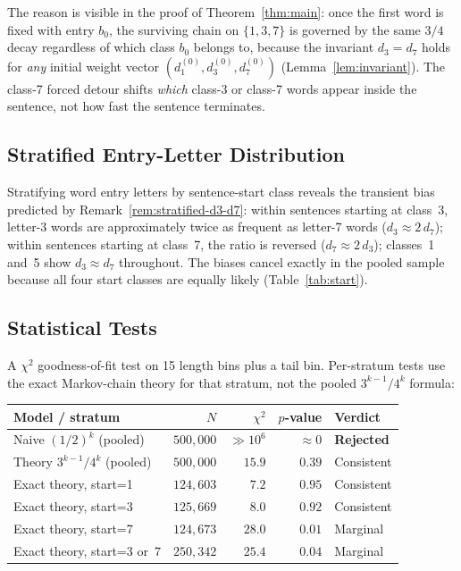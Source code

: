 \documentclass[12pt]{article}
\theoremstyle{definition}
\theoremstyle{remark}
\begin{document}
The reason is visible in the proof of Theorem~\ref{thm:main}: once the
first word is fixed with entry $b_0$, the surviving chain on $\{1,3,7\}$
is governed by the same $3/4$ decay regardless of which class $b_0$
belongs to, because the invariant $d_3 = d_7$ holds for \emph{any}
initial weight vector $(d_1^{(0)}, d_3^{(0)}, d_7^{(0)})$
(Lemma~\ref{lem:invariant}).
The class-7 forced detour shifts \emph{which} class-3 or class-7 words
appear inside the sentence, not how fast the sentence terminates.

\subsection*{Stratified Entry-Letter Distribution}

Stratifying word entry letters by sentence-start class reveals the transient
bias predicted by Remark~\ref{rem:stratified-d3-d7}: within sentences
starting at class~3, letter-3 words are approximately twice as frequent as
letter-7 words ($d_3 \approx 2\,d_7$); within sentences starting at class~7,
the ratio is reversed ($d_7 \approx 2\,d_3$); classes~1 and~5 show $d_3
\approx d_7$ throughout. The biases cancel exactly in the pooled sample because
all four start classes are equally likely (Table~\ref{tab:start}).

\subsection*{Statistical Tests}

A $\chi^2$ goodness-of-fit test on 15 length bins plus a tail bin.
Per-stratum tests use the exact Markov-chain theory for that stratum,
not the pooled $3^{k-1}/4^k$ formula:

\begin{center}
\begin{tabular}{lrrrl}
\toprule
Model / stratum & $N$ & $\chi^2$ & $p$-value & Verdict \\
\midrule
Naive $(1/2)^k$ (pooled)              & $500{,}000$ & ${\gg}10^6$ & $\approx 0$ & \textbf{Rejected} \\
Theory $3^{k-1}/4^k$ (pooled)         & $500{,}000$ & $15.9$      & $0.39$      & Consistent \\
\midrule
Exact theory, start=1       & $124{,}603$ & $ 7.2$ & $0.95$ & Consistent \\
Exact theory, start=3       & $125{,}669$ & $ 8.0$ & $0.92$ & Consistent \\
Exact theory, start=7       & $124{,}673$ & $28.0$ & $0.01$ & Marginal \\
Exact theory, start=3 or~7  & $250{,}342$ & $25.4$ & $0.04$ & Marginal \\
\bottomrule
\end{tabular}
\end{center}
\end{document}
